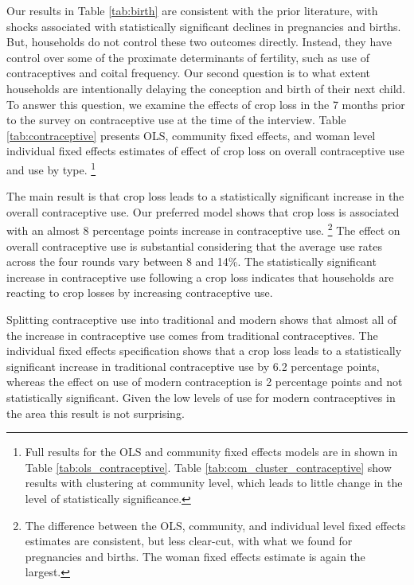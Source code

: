 \documentclass[letterpaper,12pt]{article}
\begin{document}



Our results in Table \ref{tab:birth} are consistent with the prior literature,
with shocks associated with statistically significant declines in pregnancies 
and births.
But, households do not control these two outcomes directly.
Instead, they have control over some of the proximate determinants of fertility, 
such as use of contraceptives and coital frequency.
Our second question is to what extent households are intentionally delaying 
the conception and birth of their next child. 
To answer this question, we examine the effects of crop loss in the 7 months
prior to the survey on contraceptive use at the time of the interview. 
Table \ref{tab:contraceptive} presents OLS, community fixed effects, and woman 
level individual fixed effects estimates of  effect of crop loss on overall 
contraceptive use and use by type.%
\footnote{
Full results for the OLS and community fixed effects models are in shown in 
Table \ref{tab:ols_contraceptive}.
Table \ref{tab:com_cluster_contraceptive} show results with clustering at
community level, which leads to little change in the level of
statistically significance.
}

The main result is that crop loss leads to a statistically significant 
increase in the overall contraceptive use.
Our preferred model shows that crop loss is associated with
an almost 8 percentage points increase in contraceptive use.%
\footnote{
The difference between the OLS, community, and individual level fixed effects
estimates are consistent, but less clear-cut, with what we found for pregnancies 
and births.
The woman fixed effects estimate is again the largest.
}
The effect on overall contraceptive use is substantial considering that the 
average use rates across the four rounds vary between 8 and 14\%.
The statistically significant increase in contraceptive use following
a crop loss indicates that households are reacting to crop 
losses by increasing contraceptive use.

Splitting contraceptive use into traditional and modern shows that almost
all of the increase in contraceptive use comes from traditional contraceptives.
The individual fixed effects specification shows that a
crop loss leads to a statistically significant increase in
traditional contraceptive use by 6.2 percentage points, whereas
the effect on use of modern contraception is 2 percentage points
and not statistically significant. 
Given the low levels of use for modern contraceptives in the area
this result is not surprising.
\end{document}
